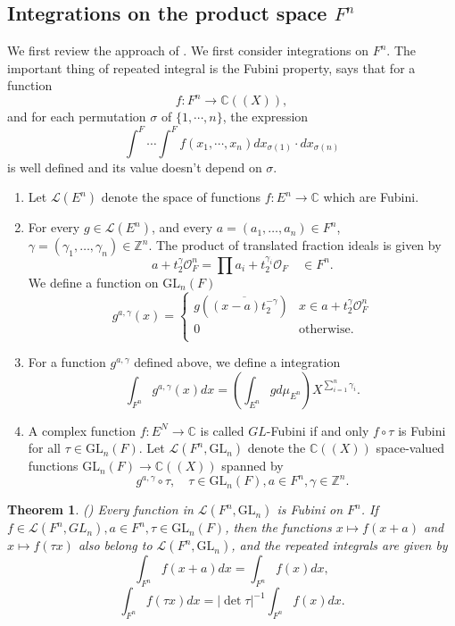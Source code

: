 \documentclass{amsart}
\newtheorem{theorem}{Theorem}[section]
\theoremstyle{definition}
\theoremstyle{remark}
\numberwithin{equation}{section}
\def  \GL        {\mathrm{GL}}
\def  \cl       {\mathcal{L}}
\def  \co       {\mathcal{O}}
\def  \bc       {\mathbb{C}}
\def  \bz       {\mathbb{Z}}
\begin{document}
\subsection{Integrations on  the product space $F^n$}
We first review the approach of  \cite{morrow2008integration}.   We first consider  integrations on $F^n$.   The important thing of repeated integral is  the Fubini property, says that for a function
$$
f: F^n \to \bc((X)),
$$
and  for each permutation  $\sigma $  of $\{1, \cdots, n\}$, the expression
$$
\int^F  \cdots \int^F f(x_1,  \cdots ,x_n) dx_{\sigma(1)} \cdot dx_{\sigma(n)}
$$
is well defined and its value doesn't depend on $\sigma$.
\begin{enumerate}
	\item  Let $\cl(E^n)$ denote the space of functions $f: E^n \to \bc$ which are Fubini.
	\item For every $g \in \cl(E^n)$, and every $a=(a_1, \dots,  a_n) \in F^n$, $\gamma =(\gamma_1, \dots, \gamma_n) \in  \bz^n$. The  product of translated fraction ideals is given by
	$$
	 a+ t_2^{\gamma} \co_F^n=    \prod  a_i + t_2^{\gamma_i}\co_F    \quad   \in F^n.
	$$
	We define a function on $\GL_n(F)$
		$$
	g^{a, \gamma}(x) = \left \{
	\begin{array}{ll}
		g(\overline{(x-a)t_2^{-\gamma}} )  &  x \in a + t_2^{\gamma} \co_F^n  \\
		0    &  \text{otherwise}.   \\
	\end{array} 
	\right.
	$$
	\item  For a function $g^{a, \gamma}$ defined above, we define a integration 
	$$
	\int_{F^n}g ^{a, \gamma}(x
	)dx  = \left(\int_{E^n}  g d\mu_{E^n}  \right) X^{\sum_{i=1}^{n} \gamma_i}.
	$$
	 \item A complex function $f: E^N \to \bc$ is called $GL$-Fubini if and only $f  \circ \tau$ is Fubini for all $\tau \in \GL_n(F)$. Let $\cl(F^n, \GL_n)$ denote the $\bc((X))$ space-valued functions $\GL_n(F) \to \bc((X))$ spanned by
	 $$
	 g^{a ,\gamma}\circ \tau, \quad  \tau \in \GL_n(F), a \in F^n, \gamma \in \bz^n.
	 $$
\end{enumerate}

\begin{theorem}(\cite[Theorem 3.4]{morrow2008integration})  \label{fnfubini}
	 Every function in $\cl(F^n, \GL_n)$ is Fubini on $F^n$. If $f \in \cl(F^n ,GL_n), a \in F^n, \tau \in \GL_n(F)$, then the functions $x \mapsto f(x+a)$ and $x \mapsto f(\tau x)$ also belong to $\cl(F^n, \GL_n)$, and the repeated integrals are given by
	 $$
	 \int_{F^n}  f(x +a) dx = \int_{F^n} f(x)dx,
	 $$
	 $$
	   \int_{F^n}f(\tau  x) dx = |\det \tau|^{-1} \int_{F^n} f(x)dx.
	 $$
\end{theorem}
\end{document}
